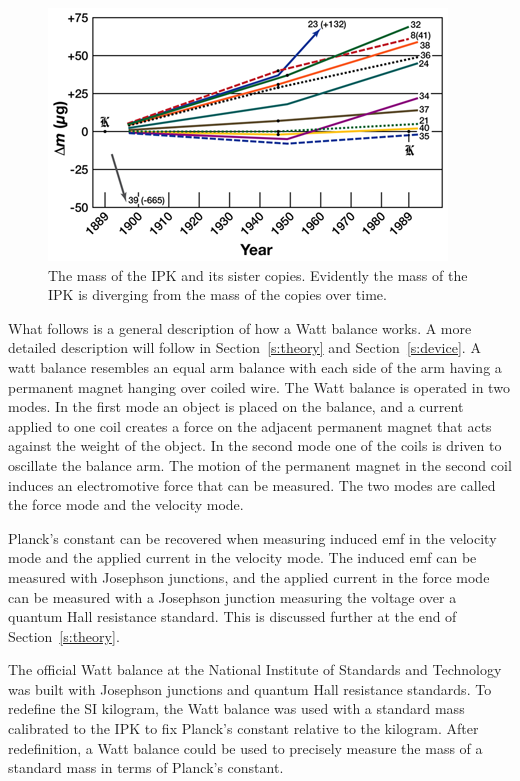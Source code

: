 \documentclass[aps,prstab,reprint,12pt]{revtex4-1}
\begin{document}
\begin{figure}[t]
    \centering
    \includegraphics[width=0.95\linewidth]{figs/ipk_mass_drift.png}
    \caption{The mass of the IPK and its sister copies. Evidently the mass of the IPK is diverging from the mass of the copies over time.}
    \label{fig:ipk_divergence}
\end{figure}


What follows is a general description of how a Watt balance works. A more detailed description will follow in Section~\ref{s:theory} and Section~\ref{s:device}.
A watt balance resembles an equal arm balance with each side of the arm having a permanent magnet hanging over coiled wire. The Watt balance is operated in two modes. In the first mode an object is placed on the balance, and a current applied to one coil creates a force on the adjacent permanent magnet that acts against the weight of the object. In the second mode one of the coils is driven to oscillate the balance arm. The motion of the permanent magnet in the second coil induces an electromotive force that can be measured. The two modes are called the force mode and the velocity mode.


Planck's constant can be recovered when measuring induced emf in the velocity mode and the applied current in the velocity mode. The induced emf can be measured with Josephson junctions, and the applied current in the force mode can be measured with a Josephson junction measuring the voltage over a quantum Hall resistance standard. This is discussed further at the end of Section~\ref{s:theory}.

The official Watt balance at the National Institute of Standards and Technology was built with Josephson junctions and quantum Hall resistance standards. To redefine the SI kilogram, the Watt balance was used with a standard mass calibrated to the IPK to fix Planck's constant relative to the kilogram. After redefinition, a Watt balance could be used to precisely measure the mass of a standard mass in terms of Planck's constant.
\end{document}
